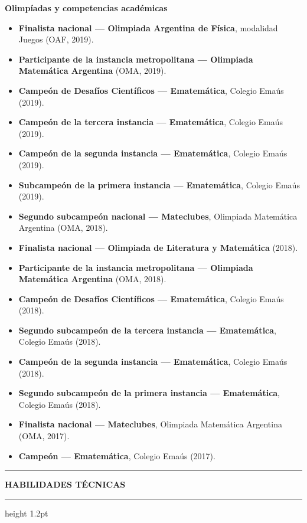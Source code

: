 \documentclass[11pt,letterpaper]{article}
\newcommand{\cvsection}[1]{%
  \Needspace{4\baselineskip}%
  \vspace{0.55em}%
  \noindent
  {\color{accent}\rule[-0.18em]{3pt}{1.25em}}%
  \hspace{0.45em}%
  {\large\bfseries\color{accentdark}\MakeUppercase{#1}}%
  \hspace{0.55em}%
  {\color{accentlight}\leaders\hrule height 1.2pt\hfill\kern0pt}\par
  \vspace{0.28em}%
}
\begin{document}
\newpage
{\large\bfseries\color{accentdark}Olimpíadas y competencias académicas}\par
\begin{itemize}
  \item \textbf{Finalista nacional --- Olimpiada Argentina de Física}, modalidad Juegos
    (OAF, 2019).
  \item \textbf{Participante de la instancia metropolitana --- Olimpiada Matemática
    Argentina} (OMA, 2019).
  \item \textbf{Campeón de Desafíos Científicos --- Ematemática}, Colegio Emaús (2019).
  \item \textbf{Campeón de la tercera instancia --- Ematemática}, Colegio Emaús (2019).
  \item \textbf{Campeón de la segunda instancia --- Ematemática}, Colegio Emaús (2019).
  \item \textbf{Subcampeón de la primera instancia --- Ematemática}, Colegio Emaús (2019).
  \item \textbf{Segundo subcampeón nacional --- Mateclubes}, Olimpiada Matemática
    Argentina (OMA, 2018).
  \item \textbf{Finalista nacional --- Olimpiada de Literatura y Matemática} (2018).
  \item \textbf{Participante de la instancia metropolitana --- Olimpiada Matemática
    Argentina} (OMA, 2018).
  \item \textbf{Campeón de Desafíos Científicos --- Ematemática}, Colegio Emaús (2018).
  \item \textbf{Segundo subcampeón de la tercera instancia --- Ematemática}, Colegio
    Emaús (2018).
  \item \textbf{Campeón de la segunda instancia --- Ematemática}, Colegio Emaús (2018).
  \item \textbf{Segundo subcampeón de la primera instancia --- Ematemática}, Colegio
    Emaús (2018).
  \item \textbf{Finalista nacional --- Mateclubes}, Olimpiada Matemática Argentina
    (OMA, 2017).
  \item \textbf{Campeón --- Ematemática}, Colegio Emaús (2017).
\end{itemize}

\newpage
\cvsection{Habilidades técnicas}
\end{document}
